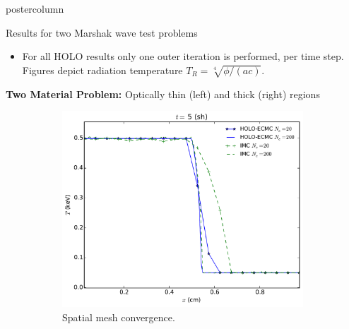 \documentclass[xcolor=dvipsnames]{beamer}
\begin{document}
\begin{frame}
\begin{columns}
\begin{column}{.49\textwidth}
\begin{beamercolorbox}[center,wd=\textwidth]{postercolumn}
\begin{minipage}[T]{0.95\textwidth}
{ %
    \begin{block}{Results for two Marshak wave test problems}
    \begin{itemize}
        \setlength\itemsep{0.2em}
        \item For all HOLO results only one outer iteration is performed, per time
            step. Figures depict radiation temperature $T_R = \sqrt[4]{\phi/(ac)}$.
    \end{itemize}
    \vspace{0.7em}
    \centering \textbf{Two Material Problem:} Optically thin (left) and thick (right) regions
\begin{figure}
\begin{subfigure}{0.49\textwidth}
    \centering
    \includegraphics[width=0.99\textwidth]{two_mat_conv.pdf}
    \caption{Spatial mesh convergence.\label{twomat_full}}
\end{subfigure} 
\begin{subfigure}{0.49\textwidth}
\centering

\end{subfigure}
\end{figure}
\end{block}}
\end{minipage}
\end{beamercolorbox}
\end{column}
\end{columns}
\end{frame}
\end{document}
